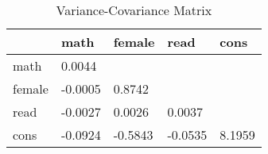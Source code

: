 \begin{table}[htbp]
\caption{\label{clabel} Variance-Covariance Matrix}\centering\medskip
\begin{tabular}{lllll} \hline \hline
 & math  & female  & read  & cons  \\  \hline 
math & 0.0044 \\  
female & -0.0005 & 0.8742 \\  
read & -0.0027 & 0.0026 & 0.0037 \\  
cons & -0.0924 & -0.5843 & -0.0535 & 8.1959 \\  
\hline \hline \end{tabular}
\end{table}
